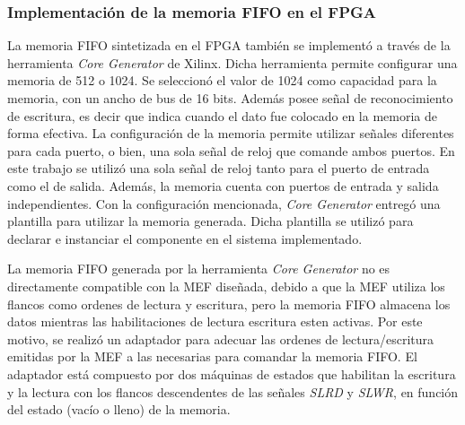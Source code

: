 	\subsubsection{Implementación de la memoria FIFO en el FPGA}
		La memoria FIFO sintetizada en el FPGA también se implementó a través de la herramienta {\it Core Generator} de Xilinx. Dicha herramienta permite configurar una memoria de \si{512} o \SI{1024}{\byte}. Se seleccionó el valor de \SI{1024}{\byte} como capacidad para la memoria, con un ancho de bus de 16 bits. Además posee señal de reconocimiento de escritura, es decir que indica cuando el dato fue colocado en la memoria de forma efectiva. La configuración de la memoria permite utilizar señales diferentes para cada puerto, o bien, una sola señal de reloj que comande ambos puertos. En este trabajo se utilizó una sola señal de reloj tanto para el puerto de entrada como el de salida. Además, la memoria cuenta con puertos de entrada y salida independientes. Con la configuración mencionada, {\it Core Generator} entregó una plantilla para utilizar la memoria generada. Dicha plantilla se utilizó para declarar e instanciar el componente en el sistema implementado. 
		
		
		La memoria FIFO generada por la herramienta \textit{Core Generator} no es directamente compatible con la MEF diseñada, debido a que la MEF utiliza los flancos como ordenes de lectura y escritura, pero la memoria FIFO almacena los datos mientras las habilitaciones de lectura escritura esten activas. Por este motivo, se realizó un adaptador para adecuar las ordenes de lectura/escritura emitidas por la MEF a las necesarias para comandar la memoria FIFO. El adaptador está compuesto por dos máquinas de estados que habilitan la escritura y la lectura con los flancos descendentes de las señales \textit{SLRD} y \textit{SLWR}, en función del estado (vacío o lleno) de la memoria.
		
